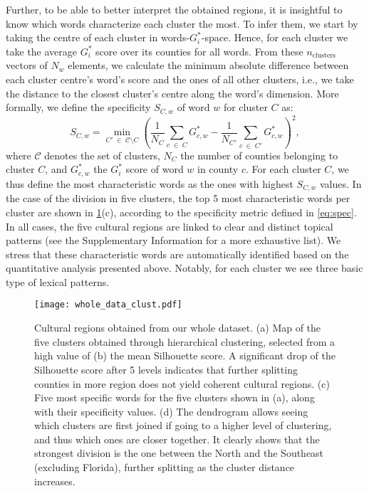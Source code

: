 \documentclass[../thesis.tex]{subfiles}
\begin{document}
Further, to be able to better interpret the obtained regions, it is insightful to know
which words characterize each cluster the most. To infer them, we start by taking the
centre of each cluster in words-$G_i^*$-space. Hence, for each cluster we take the
average $G_i^*$ score over its counties for all words. From these $n_{\text{clusters}}$
vectors of $N_w$ elements, we calculate the minimum absolute difference between each
cluster centre's word's score and the ones of all other clusters, i.e., we take the
distance to the closest cluster's centre along the word's dimension. More formally, we
define the specificity $S_{C, w}$ of word $w$ for cluster $C$ as:
\begin{equation}
\label{eq:spec}
  S_{C, w} = \min_{C' \; \in \; \mathcal{C} \setminus C} \left(
  \frac{1}{N_C} \sum_{c \; \in \; C} G_{c, w}^*
    - \frac{1}{N_{C'}} \sum_{c \; \in \; C'} G_{c, w}^*
  \right)^2 ,
\end{equation}
where $\mathcal{C}$ denotes the set of clusters, $N_C$ the number of counties belonging
to cluster $C$, and $G_{c, w}^*$ the $G_i^*$ score of word $w$ in county $c$. For each
cluster $C$, we thus define the most characteristic words as the ones with highest
$S_{C, w}$ values. In the case of the division in five clusters, the top 5 most
characteristic words per cluster are shown in \cref{fig:whole_data_clust}(c), according
to the specificity metric defined in \cref{eq:spec}. In all cases, the five cultural
regions are linked to clear and distinct topical patterns (see the Supplementary
Information for a more exhaustive list). We stress that these characteristic words are
automatically identified based on the quantitative analysis presented above. Notably,
for each cluster we see three basic type of lexical patterns. 

\begin{figure}[ht!]
\centering
  \texttt{[image: whole\_data\_clust.pdf]}
  \caption{Cultural regions obtained from our whole dataset. (a) Map of the five
  clusters obtained through hierarchical clustering, selected from a high value of (b)
  the mean Silhouette score. A significant drop of the Silhouette score after 5 levels
  indicates that further splitting counties in more region does not yield coherent
  cultural regions. (c) Five most specific words for the five clusters shown in (a),
  along with their specificity values. (d) The dendrogram allows seeing which clusters
  are first joined if going to a higher level of clustering, and thus which ones are
  closer together. It clearly shows that the strongest division is the one between the
  North and the Southeast (excluding Florida), further splitting as the cluster
  distance increases.}
  \label{fig:whole_data_clust}
\end{figure}  
\end{document}

